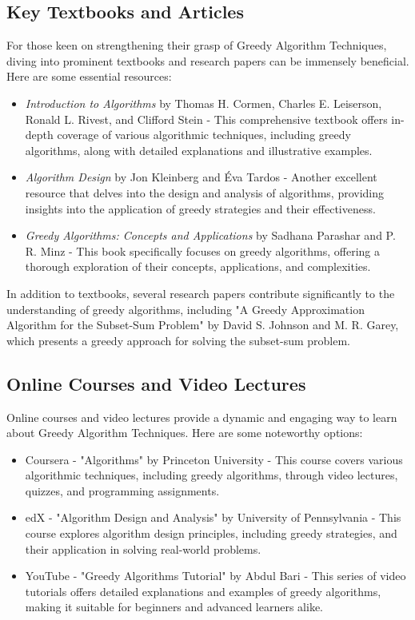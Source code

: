 \documentclass[12pt]{book} %
\begin{document}
\subsection{Key Textbooks and Articles}
For those keen on strengthening their grasp of Greedy Algorithm Techniques, diving into prominent textbooks and research papers can be immensely beneficial. Here are some essential resources:

\begin{itemize}
    \item \textit{Introduction to Algorithms} by Thomas H. Cormen, Charles E. Leiserson, Ronald L. Rivest, and Clifford Stein - This comprehensive textbook offers in-depth coverage of various algorithmic techniques, including greedy algorithms, along with detailed explanations and illustrative examples.
    \item \textit{Algorithm Design} by Jon Kleinberg and Éva Tardos - Another excellent resource that delves into the design and analysis of algorithms, providing insights into the application of greedy strategies and their effectiveness.
    \item \textit{Greedy Algorithms: Concepts and Applications} by Sadhana Parashar and P. R. Minz - This book specifically focuses on greedy algorithms, offering a thorough exploration of their concepts, applications, and complexities.
\end{itemize}

In addition to textbooks, several research papers contribute significantly to the understanding of greedy algorithms, including "A Greedy Approximation Algorithm for the Subset-Sum Problem" by David S. Johnson and M. R. Garey, which presents a greedy approach for solving the subset-sum problem.

\subsection{Online Courses and Video Lectures}
Online courses and video lectures provide a dynamic and engaging way to learn about Greedy Algorithm Techniques. Here are some noteworthy options:

\begin{itemize}
    \item Coursera - "Algorithms" by Princeton University - This course covers various algorithmic techniques, including greedy algorithms, through video lectures, quizzes, and programming assignments.
    \item edX - "Algorithm Design and Analysis" by University of Pennsylvania - This course explores algorithm design principles, including greedy strategies, and their application in solving real-world problems.
    \item YouTube - "Greedy Algorithms Tutorial" by Abdul Bari - This series of video tutorials offers detailed explanations and examples of greedy algorithms, making it suitable for beginners and advanced learners alike.
\end{itemize}
\end{document}
